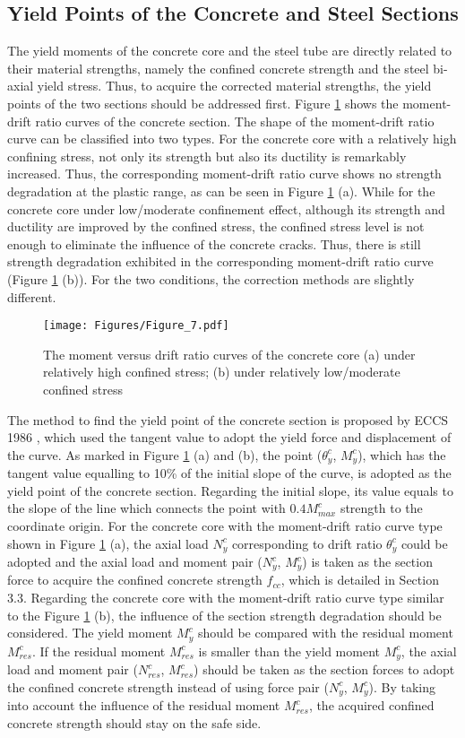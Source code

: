\documentclass[12pt,a4]{article}
\begin{document}
	\subsection{Yield Points of the Concrete and Steel Sections}
	The yield moments of the concrete core and the steel tube are directly related to their material strengths, namely the confined concrete strength and the steel bi-axial yield stress. Thus, to acquire the corrected material strengths, the yield points of the two sections should be addressed first. Figure \ref{fig-6} shows the moment-drift ratio curves of the concrete section. The shape of the moment-drift ratio curve can be classified into two types. For the concrete core with a relatively high confining stress, not only its strength but also its ductility is remarkably increased. Thus, the corresponding moment-drift ratio curve shows no strength degradation at the plastic range, as can be seen in Figure \ref{fig-6} (a). While for the concrete core under low/moderate confinement effect, although its strength and ductility are improved by the confined stress, the confined stress level is not enough to eliminate the influence of the concrete cracks. Thus, there is still strength degradation exhibited in the corresponding moment-drift ratio curve (Figure \ref{fig-6} (b)). For the two conditions, the correction methods are slightly different.
	\par
	\begin{figure}[h]
		\centering
		\texttt{[image: Figures/Figure\_7.pdf]}
		\caption{The moment versus drift ratio curves of the concrete core (a) under relatively high confined stress; (b) under relatively low/moderate confined stress}
		\label{fig-6}
	\end{figure}
	\par
	The method to find the yield point of the concrete section is proposed by ECCS 1986 \cite{RN88}, which used the tangent value to adopt the yield force and displacement of the curve. As marked in Figure \ref{fig-6} (a) and (b), the point ($θ_y^c$, $M_y^c$), which has the tangent value equalling to 10\% of the initial slope of the curve, is adopted as the yield point of the concrete section. Regarding the initial slope, its value equals to the slope of the line which connects the point with $0.4M_{max}^c$ strength to the coordinate origin. For the concrete core with the moment-drift ratio curve type shown in Figure \ref{fig-6} (a), the axial load $N_y^c$ corresponding to drift ratio $θ_y^c$ could be adopted and the axial load and moment pair ($N_y^c$, $M_y^c$) is taken as the section force to acquire the confined concrete strength $f_{cc}$, which is detailed in Section 3.3. Regarding the concrete core with the moment-drift ratio curve type similar to the Figure \ref{fig-6} (b), the influence of the section strength degradation should be considered. The yield moment $M_y^c$ should be compared with the residual moment $M_{res}^c$. If the residual moment $M_{res}^c$ is smaller than the yield moment $M_y^c$, the axial load and moment pair ($N_{res}^c$, $M_{res}^c$) should be taken as the section forces to adopt the confined concrete strength instead of using force pair ($N_y^c$, $M_y^c$). By taking into account the influence of the residual moment $M_{res}^c$, the acquired confined concrete strength should stay on the safe side.
\end{document}
